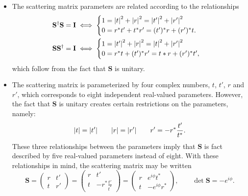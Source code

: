\documentclass[11pt, a4paper]{article}
\renewcommand{\vec}[1]{\bm{#1}}  %
\newcommand{\mat}[1]{\mathbf{#1}}  %
\renewcommand{\S}{\vec{S}}  %
\renewcommand{\SS}{\mat{S}}  %
\begin{document}
\begin{itemize}
    \item The scattering matrix parameters are related according to the relationships
    \begin{align*}
        & \SS^{\dagger} \SS = \mathbf{I} \iff 
        \begin{cases}
            1 = \abs{t}^{2} + \abs{r}^{2} = \abs{t'}^{2} + \abs{r'}^{2}\\
            0 = r^{*} t' + t^{*} r' = (t')^{*} r + (r')^{*}t.
        \end{cases}\\
        & \SS \SS^{\dagger} = \mathbf{I} \iff 
        \begin{cases}
            1 = \abs{t'}^{2} + \abs{r}^{2} = \abs{t}^{2} + \abs{r'}^{2}\\
            0 = r^{*}t + (t')^{*}r' = t*r + (r')^{*}t',
        \end{cases}  
    \end{align*}
    which follow from the fact that $ \SS $ is unitary.
    
    \item The scattering matrix is parameterized by four complex numbers, $ t $, $ t' $, $ r $ and $ r' $, which corresponds to eight independent real-valued parameters. However, the fact that $ \S $ is unitary creates certain restrictions on the parameters, namely:
    \begin{equation*}
        \abs{t} = \abs{t'} \qquad \abs{r} = \abs{r'} \qquad r' = -r^{*}\frac{t'}{t^{*}}.
    \end{equation*}
    These three relationships between the parameters imply that $ \SS $ is fact described by five real-valued parameters instead of eight. With these relationships in mind, the scattering matrix may be written
    \begin{equation*}
        \SS = 
        \begin{pmatrix}
            r & t'\\
            t & r'
        \end{pmatrix}
        = 
        \begin{pmatrix}
            r & t'\\
            t & - r^{*}\frac{t'}{t^{*}}
        \end{pmatrix}
        = 
        \begin{pmatrix}
            r & e^{i\phi}t^{*}\\
            t & - e^{i\phi}r^{*}
        \end{pmatrix}, \qquad \det \S = - e^{i\phi}.
    \end{equation*}
    
\end{itemize}
\end{document}
